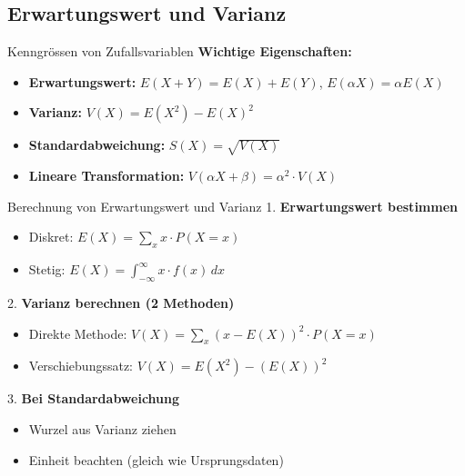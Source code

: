 \subsection{Erwartungswert und Varianz}

\begin{concept}{Kenngrössen von Zufallsvariablen}
\textbf{Wichtige Eigenschaften:}
\begin{itemize}
    \item \textbf{Erwartungswert:} $E(X + Y) = E(X) + E(Y)$, $E(\alpha X) = \alpha E(X)$
    \item \textbf{Varianz:} $V(X) = E(X^2) - E(X)^2$
    \item \textbf{Standardabweichung:} $S(X) = \sqrt{V(X)}$
    \item \textbf{Lineare Transformation:} $V(\alpha X + \beta) = \alpha^2 \cdot V(X)$
\end{itemize}
\end{concept}

\begin{KR}{Berechnung von Erwartungswert und Varianz}
1. \textbf{Erwartungswert bestimmen}
   \begin{itemize}
   \item Diskret: $E(X) = \sum_{x} x \cdot P(X=x)$
   \item Stetig: $E(X) = \int_{-\infty}^{\infty} x \cdot f(x) \, dx$
   \end{itemize}

2. \textbf{Varianz berechnen (2 Methoden)}
   \begin{itemize}
   \item Direkte Methode: $V(X) = \sum_{x} (x-E(X))^2 \cdot P(X=x)$
   \item Verschiebungssatz: $V(X) = E(X^2) - (E(X))^2$
   \end{itemize}

3. \textbf{Bei Standardabweichung}
   \begin{itemize}
   \item Wurzel aus Varianz ziehen
   \item Einheit beachten (gleich wie Ursprungsdaten)
   \end{itemize}
\end{KR}

